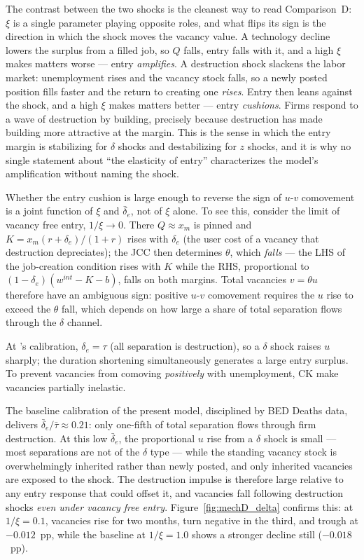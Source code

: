 \documentclass[authoryear, review, 12pt]{elsarticle}
\begin{document}
The contrast between the two shocks is the cleanest way to read
Comparison~D: $\xi$ is a single parameter playing opposite roles, and what
flips its sign is the direction in which the shock moves the vacancy value.
A technology decline lowers the surplus from a filled job, so $Q$ falls,
entry falls with it, and a high $\xi$ makes matters worse --- entry
\emph{amplifies}.  A destruction shock slackens the labor market:
unemployment rises and the vacancy stock falls, so a newly posted position
fills faster and the return to creating one \emph{rises}.  Entry then
leans against the shock, and a high $\xi$ makes matters better --- entry
\emph{cushions}.  Firms respond to a wave of destruction
by building, precisely because destruction has made building more
attractive at the margin.  This is the sense in which the entry margin is
stabilizing for $\delta$ shocks and destabilizing for $z$ shocks, and it is
why no single statement about ``the elasticity of entry'' characterizes the
model's amplification without naming the shock.

Whether the entry cushion is large enough to reverse the sign of
$u$-$v$ comovement is a joint function of $\xi$ and $\bar\delta_e$,
not of $\xi$ alone.  To see this, consider the limit of vacancy free entry,
$1/\xi\to 0$.  There $Q\approx x_m$ is pinned and
$K=x_m(r+\delta_e)/(1+r)$ rises with $\delta_e$ (the user cost of a vacancy that destruction depreciates);
the JCC then determines $\theta$, which \emph{falls} --- the LHS of the
job-creation condition rises with $K$ while the RHS, proportional to
$(1-\delta_e)(w^{int}-K-b)$, falls on both margins.  Total vacancies
$v=\theta u$ therefore have an ambiguous sign: positive $u$-$v$
comovement requires the $u$ rise to exceed the $\theta$ fall, which
depends on how large a share of total separation flows through the
$\delta$ channel.

At \citeauthor{coles_2018}'s calibration, $\delta_e=\tau$ (all separation
is destruction), so a $\delta$ shock raises $u$ sharply; the duration
shortening simultaneously generates a large entry surplus. To prevent vacancies from comoving \emph{positively} with unemployment, CK make vacancies partially inelastic.

The baseline calibration of the present model, disciplined by BED Deaths
data, delivers $\bar\delta_e/\bar\tau\approx 0.21$: only one-fifth of
total separation flows through firm destruction.  At this low $\bar\delta_e$,
the proportional $u$ rise from a $\delta$ shock is small --- most
separations are not of the $\delta$ type --- while the standing vacancy
stock is overwhelmingly inherited rather than newly posted, and only
inherited vacancies are exposed to the shock.  The destruction impulse is
therefore large relative to any entry response that could offset it, and
vacancies fall following destruction shocks \emph{even under vacancy free entry}.  Figure~\ref{fig:mechD_delta} confirms this:
at $1/\xi=0.1$, vacancies rise for two months, turn negative
in the third, and trough at $-0.012$~pp, while the baseline at
$1/\xi=1.0$ shows a stronger decline still ($-0.018$~pp).
\end{document}
